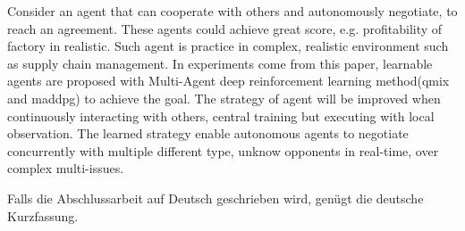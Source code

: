 
Consider an agent that can cooperate with others and autonomously negotiate, to reach an agreement. These agents could achieve great score, e.g. profitability of factory in realistic. Such agent is practice in complex, realistic environment such as supply chain management. In experiments come from this paper, learnable agents are proposed with Multi-Agent deep reinforcement learning method(\gls{qmix} and \gls{maddpg}) to achieve the goal. The strategy of agent will be improved when continuously interacting with others, central training but executing with local observation. The learned strategy enable autonomous agents to negotiate concurrently with multiple different type, unknow opponents in real-time, over complex multi-issues.


Falls die Abschlussarbeit auf Deutsch geschrieben wird, genügt die deutsche Kurzfassung.
